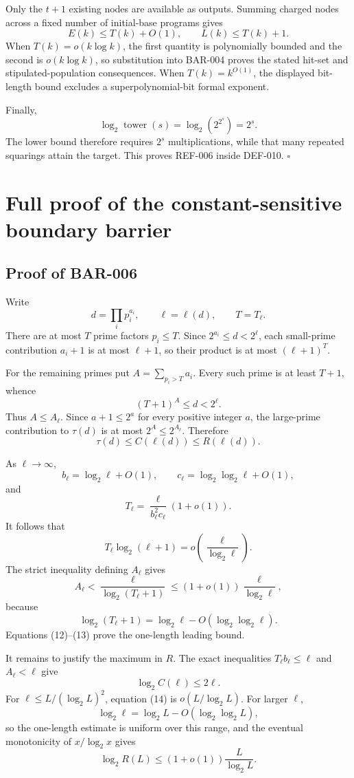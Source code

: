 \documentclass[11pt]{article}
\begin{document}
Only the \(t+1\) existing nodes are available as outputs. Summing charged
nodes across a fixed number of initial-base programs gives
\[
E(k)\le T(k)+O(1),\qquad L(k)\le T(k)+1.
\]
When \(T(k)=o(k\log k)\), the first quantity is polynomially bounded and the
second is \(o(k\log k)\), so substitution into BAR-004 proves the stated
hit-set and stipulated-population consequences. When \(T(k)=k^{O(1)}\), the
displayed bit-length bound excludes a superpolynomial-bit formal exponent.

Finally,
\[
\log_2\operatorname{tower}(s)
=\log_2(2^{2^s})
=2^s.
\]
The lower bound therefore requires \(2^s\) multiplications, while that many
repeated squarings attain the target. This proves REF-006 inside DEF-010.
\(\square\)

\section{Full proof of the constant-sensitive boundary barrier}

\subsection{Proof of BAR-006}\label{proof:BAR-006}

Write
\[
d=\prod_i p_i^{a_i},\qquad \ell=\ell(d),\qquad T=T_\ell.
\]
There are at most \(T\) prime factors \(p_i\le T\). Since
\(2^{a_i}\le d<2^\ell\), each small-prime contribution \(a_i+1\) is at most
\(\ell+1\), so their product is at most \((\ell+1)^T\).

For the remaining primes put \(A=\sum_{p_i>T}a_i\). Every such prime is at
least \(T+1\), whence
\[
(T+1)^A\le d<2^\ell.
\]
Thus \(A\le A_\ell\). Since \(a+1\le2^a\) for every positive integer \(a\),
the large-prime contribution to \(\tau(d)\) is at most
\(2^A\le2^{A_\ell}\). Therefore
\[
\tau(d)\le C(\ell(d))\le R(\ell(d)).
\tag{11}
\]

As \(\ell\to\infty\),
\[
b_\ell=\log_2\ell+O(1),\qquad
c_\ell=\log_2\log_2\ell+O(1),
\]
and
\[
T_\ell=\frac{\ell}{b_\ell^2c_\ell}(1+o(1)).
\]
It follows that
\[
T_\ell\log_2(\ell+1)
=o\left(\frac{\ell}{\log_2\ell}\right).
\tag{12}
\]
The strict inequality defining \(A_\ell\) gives
\[
A_\ell<\frac{\ell}{\log_2(T_\ell+1)}
\le(1+o(1))\frac{\ell}{\log_2\ell},
\tag{13}
\]
because
\[
\log_2(T_\ell+1)
=\log_2\ell-O(\log_2\log_2\ell).
\]
Equations (12)--(13) prove the one-length leading bound.

It remains to justify the maximum in \(R\). The exact inequalities
\(T_\ell b_\ell\le\ell\) and \(A_\ell<\ell\) give
\[
\log_2C(\ell)\le2\ell.
\tag{14}
\]
For \(\ell\le L/(\log_2L)^2\), equation (14) is
\(o(L/\log_2L)\). For larger \(\ell\),
\[
\log_2\ell=\log_2L-O(\log_2\log_2L),
\]
so the one-length estimate is uniform over this range, and the eventual
monotonicity of \(x/\log_2x\) gives
\[
\log_2R(L)\le(1+o(1))\frac{L}{\log_2L}.
\tag{15}
\]
\end{document}
